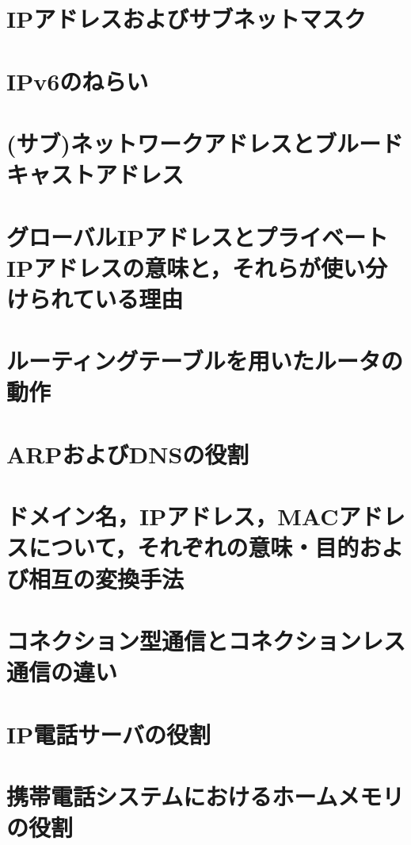 \documentclass[10.5pt]{jsarticle}
\begin{document}
\section{IPアドレスおよびサブネットマスク}



\section{IPv6のねらい}



\section{(サブ)ネットワークアドレスとブルードキャストアドレス}



\section{グローバルIPアドレスとプライベートIPアドレスの意味と，それらが使い分けられている理由}



\section{ルーティングテーブルを用いたルータの動作}



\section{ARPおよびDNSの役割}



\section{ドメイン名，IPアドレス，MACアドレスについて，それぞれの意味・目的および相互の変換手法}



\section{コネクション型通信とコネクションレス通信の違い}


\section{IP電話サーバの役割}


\section{携帯電話システムにおけるホームメモリの役割}
\end{document}
